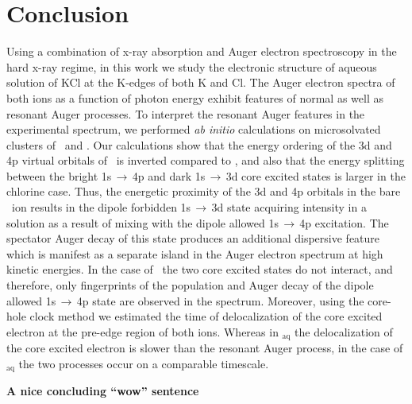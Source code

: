\section{Conclusion}\label{sec:concl}

Using a combination of x-ray absorption and Auger electron spectroscopy in the hard x-ray regime, in this work we study the electronic structure of aqueous solution of KCl at the K-edges of both K and Cl. The Auger electron spectra of both ions as a function of photon energy exhibit features of normal as well as resonant Auger processes. To interpret the resonant Auger features in the experimental spectrum, we performed {\it ab initio} calculations on microsolvated clusters of \ki~and \cli. Our calculations show that the energy ordering of the 3d and 4p virtual orbitals of \cli~is inverted compared to \ki, and also that the energy splitting between the bright 1s$\,\rightarrow\,$4p and dark 1s$\,\rightarrow\,$3d core excited states is larger in the chlorine case. Thus, the energetic proximity of the 3d and 4p orbitals in the bare \ki~ion results in the dipole forbidden 1s$\,\rightarrow\,$3d state acquiring intensity in a solution as a result of mixing with the dipole allowed 1s$\,\rightarrow\,$4p excitation. The spectator Auger decay of this state produces an additional dispersive feature which is manifest as a separate island in the Auger electron spectrum at high kinetic energies. In the case of \cli~the two core excited states do not interact, and therefore, only fingerprints of the population and Auger decay of the dipole allowed 1s$\,\rightarrow\,$4p state are observed in the spectrum. Moreover, using the core-hole clock method we estimated the time of delocalization of the core excited electron at the pre-edge region of both ions. Whereas in \ki$_{\text{aq}}$ the delocalization of the core excited electron is slower than the resonant Auger process, in the case of \cli$_{\text{aq}}$ the two processes occur on a comparable timescale.


{\bf\color{red}A nice concluding ``wow'' sentence}
